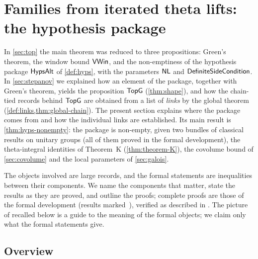 \section{Families from iterated theta lifts: the hypothesis package}\label{sec:families}

\providecommand{\familiesstr}{\operatorname{str}}
\providecommand{\familiesClosed}{\sfname{Closed}}
\providecommand{\familiesLinked}{\sfname{LinkedAt}}
\providecommand{\familiesRow}{\sfname{Row}}
\providecommand{\familiesDiii}{\mathcal{D}_3}

In \cref{sec:top} the main theorem was reduced to three propositions: Green's theorem, the window bound
$\mathsf{VWin}$, and the non-emptiness of the hypothesis package $\mathsf{HypsAlt}$ of \cref{def:hyps}, with the
parameters $\mathsf{NL}$ and $\mathsf{DefiniteSideCondition}$. In
\cref{sec:stepanov}
we explained how an element of the package, together with Green's theorem, yields the proposition
$\mathsf{TopG}$ (\cref{thm:shape}), and how the chain-tied records behind $\mathsf{TopG}$ are obtained from a
list of \emph{links} by the global theorem (\cref{def:links,thm:global-chain}). The present section
explains where the package comes from and how the individual links are established. Its main result is
\cref{thm:hyps-nonempty}: the package is non-empty, given two bundles of classical results on unitary groups
(all of them proved in the formal development), the theta-integral identities of Theorem~K
(\cref{thm:theorem-K}), the covolume bound of \cref{sec:covolume} and the local parameters of
\cref{sec:galois}.

The objects involved are large records, and the formal statements are inequalities between their components.
We name the components that matter, state the results as they are proved, and outline the proofs; complete
proofs are those of the formal development \cite{LeanSource2026} (results marked~\Fmark), verified as described in
\cite{Sutherland2026}. The picture of \cite{Announcement2026} recalled below is a guide to the meaning of the
formal objects; we claim only what the formal statements give.

\subsection{Overview}\label{sec:families:overview}

